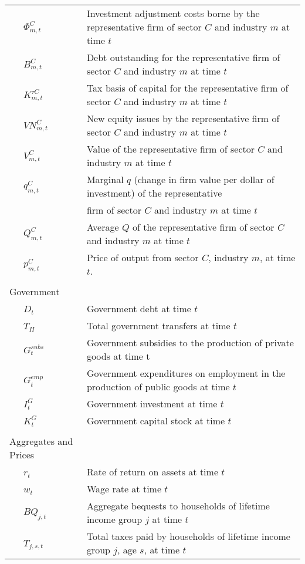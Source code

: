 \documentclass[letterpaper,12pt]{article}
\theoremstyle{definition}
\begin{document}
\begin{table}[h!]
\begin{tabular}{ll}
    \ \ \ $\Phi^{C}_{m,t}$ & Investment adjustment costs borne by the representative firm of sector $C$ and industry $m$ at time $t$ \\
    \ \ \ $B^{C}_{m,t}$ & Debt outstanding for the representative firm of sector $C$ and industry $m$ at time $t$ \\
    \ \ \ $K^{\tau C}_{m,t}$ & Tax basis of capital for the representative firm of sector $C$ and industry $m$ at time $t$ \\
    \ \ \ $VN^{C}_{m,t}$ & New equity issues by the representative firm of sector $C$ and industry $m$ at time $t$ \\
    \ \ \ $V^{C}_{m,t}$ & Value of the representative firm of sector $C$ and industry $m$ at time $t$ \\
    \ \ \ $q^{C}_{m,t}$ & Marginal $q$ (change in firm value per dollar of investment) of the representative \\
    			&  firm of sector $C$ and industry $m$ at time $t$ \\
    \ \ \ $Q^{C}_{m,t}$ & Average $Q$ of the representative firm of sector $C$ and industry $m$ at time $t$ \\
    \ \ \ $p^{C}_{m,t}$ & Price of output from sector $C$, industry $m$, at time $t$. \\
          &  \\
    Government &  \\
    \ \ \ $D_{t}$ & Government debt at time $t$ \\
    \ \ \ $T_{H}$ & Total government transfers at time $t$ \\
    \ \ \ $G^{subs}_{t}$ & Government subsidies to the production of private goods at time {t} \\
    \ \ \ $G^{emp}_{t}$ & Government expenditures on employment in the production of public goods at time $t$ \\
    \ \ \ $I^{G}_{t}$ & Government investment at time $t$ \\
    \ \ \ $K^{G}_{t}$ & Government capital stock at time $t$ \\
          &  \\
    Aggregates and Prices &  \\
    \ \ \ $r_{t}$ & Rate of return on assets at time $t$ \\
    \ \ \ $w_{t}$ & Wage rate at time $t$ \\
    \ \ \ $BQ_{j,t}$ & Aggregate bequests to households of lifetime income group $j$ at time $t$ \\
    \ \ \ $T_{j,s,t}$ & Total taxes paid by households of lifetime income group $j$, age $s$, at time $t$ \\

\end{tabular}
\end{table}
\end{document}

